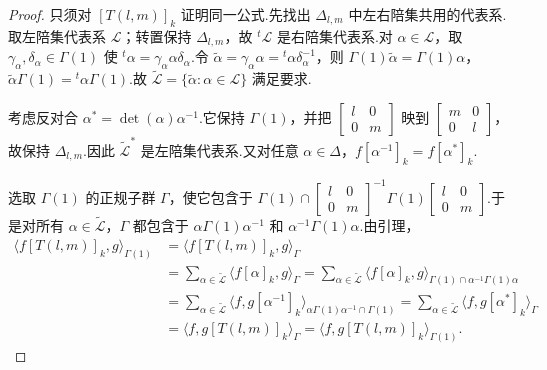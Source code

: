 \begin{proof}

只须对 $[T(l,m)]_k$ 证明同一公式.先找出 $\Delta_{l,m}$ 中左右陪集共用的代表系.取左陪集代表系 $\mathcal L$；转置保持 $\Delta_{l,m}$，故 ${}^t\mathcal L$ 是右陪集代表系.对 $\alpha\in\mathcal L$，取 $\gamma_\alpha,\delta_\alpha\in\Gamma(1)$ 使 ${}^t\alpha=\gamma_\alpha\alpha\delta_\alpha$.令 $\widetilde\alpha=\gamma_\alpha\alpha={}^t\alpha\delta_\alpha^{-1}$，则 $\Gamma(1)\widetilde\alpha=\Gamma(1)\alpha$，$\widetilde\alpha\Gamma(1)={}^t\alpha\Gamma(1)$.故 $\widetilde{\mathcal L}=\{\widetilde\alpha:\alpha\in\mathcal L\}$ 满足要求.

考虑反对合 $\alpha^*=\det(\alpha)\alpha^{-1}$.它保持 $\Gamma(1)$，并把 $\left[\begin{smallmatrix}l&0\\0&m\end{smallmatrix}\right]$ 映到 $\left[\begin{smallmatrix}m&0\\0&l\end{smallmatrix}\right]$，故保持 $\Delta_{l,m}$.因此 $\widetilde{\mathcal L}^*$ 是左陪集代表系.又对任意 $\alpha\in\Delta$，$f[\alpha^{-1}]_k=f[\alpha^*]_k$.

选取 $\Gamma(1)$ 的正规子群 $\Gamma$，使它包含于 $\Gamma(1)\cap\left[\begin{smallmatrix}l&0\\0&m\end{smallmatrix}\right]^{-1}\Gamma(1)\left[\begin{smallmatrix}l&0\\0&m\end{smallmatrix}\right]$.于是对所有 $\alpha\in\widetilde{\mathcal L}$，$\Gamma$ 都包含于 $\alpha\Gamma(1)\alpha^{-1}$ 和 $\alpha^{-1}\Gamma(1)\alpha$.由引理，
\begin{align*}
\langle f[T(l,m)]_k,g\rangle_{\Gamma(1)}&=\langle f[T(l,m)]_k,g\rangle_\Gamma\\
&=\sum_{\alpha\in\widetilde{\mathcal L}}\langle f[\alpha]_k,g\rangle_\Gamma
=\sum_{\alpha\in\widetilde{\mathcal L}}\langle f[\alpha]_k,g\rangle_{\Gamma(1)\cap\alpha^{-1}\Gamma(1)\alpha}\\
&=\sum_{\alpha\in\widetilde{\mathcal L}}\langle f,g[\alpha^{-1}]_k\rangle_{\alpha\Gamma(1)\alpha^{-1}\cap\Gamma(1)}
=\sum_{\alpha\in\widetilde{\mathcal L}}\langle f,g[\alpha^*]_k\rangle_\Gamma\\
&=\langle f,g[T(l,m)]_k\rangle_\Gamma=\langle f,g[T(l,m)]_k\rangle_{\Gamma(1)}.
\end{align*}
\end{proof}

